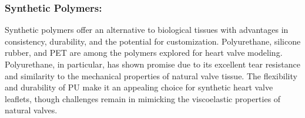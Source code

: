 
\subsubsection{Synthetic Polymers:}
Synthetic polymers offer an alternative to biological tissues with advantages in consistency, durability, and the potential for customization. Polyurethane, silicone rubber, and \gls{PET} are among the polymers explored for heart valve modeling. Polyurethane, in particular, has shown promise due to its excellent tear resistance and similarity to the mechanical properties of natural valve tissue. The flexibility and durability of \gls{PU} make it an appealing choice for synthetic heart valve leaflets, though challenges remain in mimicking the viscoelastic properties of natural valves. ~ 

